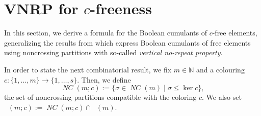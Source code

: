 \documentclass[12pt]{amsart}
\DeclareMathOperator{\NC}{\mathit{NC}} %
\DeclareMathOperator{\NCirr}{{\mathit{NC}^\textit{irr}}} %
\theoremstyle{definition}
\numberwithin{equation}{section}
\begin{document}
\section{VNRP for $c$-freeness}
\label{sec:VNRP}

In this section, we derive a formula for the Boolean cumulants of $c$-free
elements, generalizing the results from \cite{FMNS2} which express Boolean
cumulants of free elements using noncrossing partitions with so-called
\emph{vertical no-repeat property}.  
\par In order to state the next combinatorial result, we fix $m \in \mathbb{N}$
and a colouring $c:\{1,\ldots,m\}\to\{1,\ldots,s\}$.
Then, we define 
$$
\NC(m;c) := \{\sigma\in \NC(m)\;|\; \sigma\leq \ker c\},
$$
the set of noncrossing partitions compatible with the coloring $c$. We also set $\NCirr(m;c):=\NC(m;c)\cap\NCirr(m)$.
\end{document}

